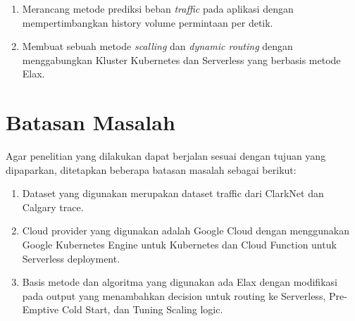 \begin{enumerate}
    \item Merancang metode prediksi beban \emph{traffic} pada aplikasi dengan mempertimbangkan history volume permintaan per detik.
    \item Membuat sebuah metode \emph{scalling} dan \emph{dynamic routing} dengan menggabungkan Kluster Kubernetes dan Serverless yang berbasis metode Elax.
\end{enumerate}

\section{Batasan Masalah}
\label{sec:batasan-masalah}

Agar penelitian yang dilakukan dapat berjalan sesuai dengan tujuan yang dipaparkan, ditetapkan beberapa batasan masalah sebagai berikut:

\begin{enumerate}
    \item Dataset yang digunakan merupakan dataset traffic dari ClarkNet dan Calgary trace.
    \item Cloud provider yang digunakan adalah Google Cloud dengan menggunakan Google Kubernetes Engine untuk Kubernetes dan Cloud Function untuk Serverless deployment.
    \item Basis metode dan algoritma yang digunakan ada Elax dengan modifikasi pada output yang menambahkan decision untuk routing ke Serverless, Pre-Emptive Cold Start, dan Tuning Scaling logic.
\end{enumerate}
